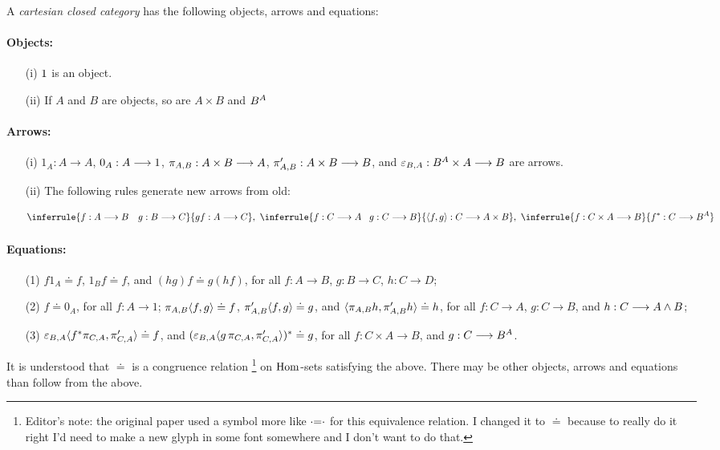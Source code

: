 \begin{defn}
A {\em cartesian closed category} has the following objects,
arrows and equations:

\paragraph{Objects:}
\begin{enumerate}
\item[(i)] $1$ is an object.
\item[(ii)] If $A$ and $B$ are objects, so are $A \times B$ and $B^{A}$
\end{enumerate}

\paragraph{Arrows:}
\begin{enumerate}
\item[(i)] $1_A: A \to A$, $0_A: A \longrightarrow 1$, $\pi_{A,B}: A \times B \longrightarrow A$, 
$\pi'_{A,B}: A \times B \longrightarrow B$,
and $\varepsilon_{B,A}: B^{A} \times A \longrightarrow B$ are arrows.

\item[(ii)] The following rules generate new arrows from old:

\[
\inferrule {f: A \to B \quad g: B \to C}{gf: A \to C},\,\,
\inferrule {f: C \to A \quad\! g: C \to B}{\la f, g \ra: C \to A \times B}, \,\,
\inferrule {f: C \times A \to B}{f^*: C \to \fexpBA}
\]

\end{enumerate}

\paragraph{Equations:}
\begin{enumerate}
\item[(1)] $f1_A \doteq f$, $1_Bf \doteq f$, and $(hg)f \doteq g(hf)$,
for all $f:A \to B$, $g:B \to C$, $h: C\to D$;
\item[(2)] $f \doteq 0_A$, for all $f: A \to 1$;
$\pi_{A,B}\langle f,g \rangle \doteq f$, $\pi'_{A,B}\langle f,g \rangle \doteq g$, and
$\langle\pi_{A,B} h, \pi'_{A,B} h\rangle \doteq h$,
for all $f:C \to A$, $g:C \to B$, and $h: C\longrightarrow A\wedge B$;
\item[(3)] $\varepsilon_{B,A}\langle f^*\pi_{C,A}, \pi'_{C,A} \rangle \doteq f$, and
$(\varepsilon_{B,A}\langle g\,\pi_{C,A}, \pi'_{C,A} \rangle)^* \doteq g$,
for all $f: C\times A \to B$, and $g: C \longrightarrow B^{A}$.
\end{enumerate}

\end{defn}
\noindent
It is understood that $\doteq$ is a congruence relation%
\footnote{Editor's note: the original paper used a symbol more like $\mathop{\cdot\mkern-5mu=\mkern-5mu\cdot}$ for this equivalence relation. I changed it to $\doteq$ because to really do it right I'd need to make a new glyph in some font somewhere and I don't want to do that.}
on $\operatorname{{Hom}}$-sets satisfying the
above. There may be other objects, arrows and equations than follow from the
above.


